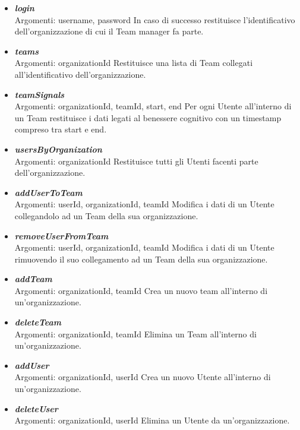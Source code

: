 \begin{itemize}
  \item \emph{\bf login}\\
  Argomenti: username, password\newline
  In caso di successo restituisce l'identificativo dell'organizzazione di cui il Team manager fa parte.
  \item \emph{\bf teams}\\
  Argomenti: organizationId\newline
  Restituisce una lista di Team collegati all'identificativo dell'organizzazione.
  \item \emph{\bf teamSignals}\\
  Argomenti: organizationId, teamId, start, end\newline
  Per ogni Utente all'interno di un Team restituisce i dati legati al benessere cognitivo con un timestamp compreso tra start e end.
  \item \emph{\bf usersByOrganization}\\
  Argomenti: organizationId\newline
  Restituisce tutti gli Utenti facenti parte dell'organizzazione.
  \item \emph{\bf addUserToTeam}\\
  Argomenti: userId, organizationId, teamId\newline
  Modifica i dati di un Utente collegandolo ad un Team della sua organizzazione.
  \item \emph{\bf removeUserFromTeam}\\
  Argomenti: userId, organizationId, teamId\newline
  Modifica i dati di un Utente rimuovendo il suo collegamento ad un Team della sua organizzazione.
  \item \emph{\bf addTeam}\\
  Argomenti: organizationId, teamId\newline
  Crea un nuovo team all'interno di un'organizzazione.
  \item \emph{\bf deleteTeam}\\
  Argomenti: organizationId, teamId\newline
  Elimina un Team all'interno di un'organizzazione.
  \item \emph{\bf addUser}\\
  Argomenti: organizationId, userId\newline
  Crea un nuovo Utente all'interno di un'organizzazione.
  \item \emph{\bf deleteUser}\\
  Argomenti: organizationId, userId\newline
  Elimina un Utente da un'organizzazione.
\end{itemize}